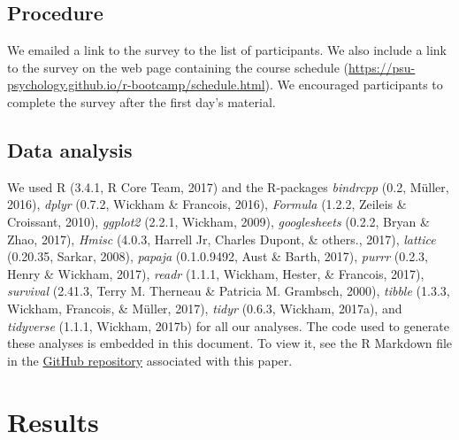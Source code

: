 \documentclass[english,man]{apa6}
\theoremstyle{definition}
\theoremstyle{definition}
\theoremstyle{remark}
\begin{document}
\subsection{Procedure}\label{procedure}

We emailed a link to the survey to the list of participants. We also
include a link to the survey on the web page containing the course
schedule
(\url{https://psu-psychology.github.io/r-bootcamp/schedule.html}). We
encouraged participants to complete the survey after the first day's
material.

\subsection{Data analysis}\label{data-analysis}

We used R (3.4.1, R Core Team, 2017) and the R-packages \emph{bindrcpp}
(0.2, Müller, 2016), \emph{dplyr} (0.7.2, Wickham \& Francois, 2016),
\emph{Formula} (1.2.2, Zeileis \& Croissant, 2010), \emph{ggplot2}
(2.2.1, Wickham, 2009), \emph{googlesheets} (0.2.2, Bryan \& Zhao,
2017), \emph{Hmisc} (4.0.3, Harrell Jr, Charles Dupont, \& others.,
2017), \emph{lattice} (0.20.35, Sarkar, 2008), \emph{papaja}
(0.1.0.9492, Aust \& Barth, 2017), \emph{purrr} (0.2.3, Henry \&
Wickham, 2017), \emph{readr} (1.1.1, Wickham, Hester, \& Francois,
2017), \emph{survival} (2.41.3, Terry M. Therneau \& Patricia M.
Grambsch, 2000), \emph{tibble} (1.3.3, Wickham, Francois, \& Müller,
2017), \emph{tidyr} (0.6.3, Wickham, 2017a), and \emph{tidyverse}
(1.1.1, Wickham, 2017b) for all our analyses. The code used to generate
these analyses is embedded in this document. To view it, see the R
Markdown file in the
\href{http://github.com/psu-psychology/r-bootcamp/papaja-demo/}{GitHub
repository} associated with this paper.

\section{Results}\label{results}
\end{document}
